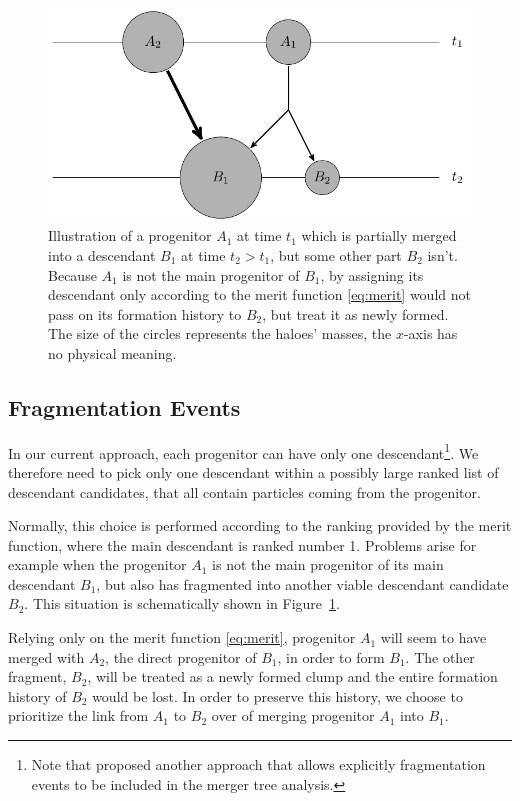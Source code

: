 \begin{figure}
  \centering
  \includegraphics[width=.9\linewidth]{./images/tikz/fracture.pdf}
  \caption{Illustration of a progenitor $A_1$ at time $t_1$ which is
    partially merged into a descendant $B_1$ at time $t_2 > t_1$, but
    some other part $B_2$ isn't.  Because $A_1$ is not the main
    progenitor of $B_1$, by assigning its descendant only according to
    the merit function \eqref{eq:merit} would not pass on its
    formation history to $B_2$, but treat it as newly formed.  The
    size of the circles represents the haloes' masses, the $x$-axis
    has no physical meaning.  }
  \label{fig:fracture}
\end{figure}

\subsection{Fragmentation Events}
\label{sect:frag}

In our current approach, each progenitor can have only one
descendant\footnote{Note that \cite{springelSimulatingCosmicStructure2020a}
proposed another approach that allows explicitly fragmentation
events to be included in the merger tree analysis.}. We therefore need
to pick only one descendant within a possibly large ranked list of
descendant candidates, that all contain particles coming from the
progenitor.

Normally, this choice is performed according to the ranking provided
by the merit function, where the main descendant is ranked number 1.
Problems arise for example when the progenitor $A_1$ is not the main
progenitor of its main descendant $B_1$, but also has fragmented into
another viable descendant candidate $B_2$.  This situation is
schematically shown in Figure~\ref{fig:fracture}.

Relying only on the merit function \eqref{eq:merit}, progenitor $A_1$
will seem to have merged with $A_2$, the direct progenitor of $B_1$,
in order to form $B_1$.  The other fragment, $B_2$, will be treated as
a newly formed clump and the entire formation history of $B_2$ would
be lost. In order to preserve this history, we choose to prioritize the 
link from $A_1$ to $B_2$ over of merging progenitor $A_1$ into $B_1$.


